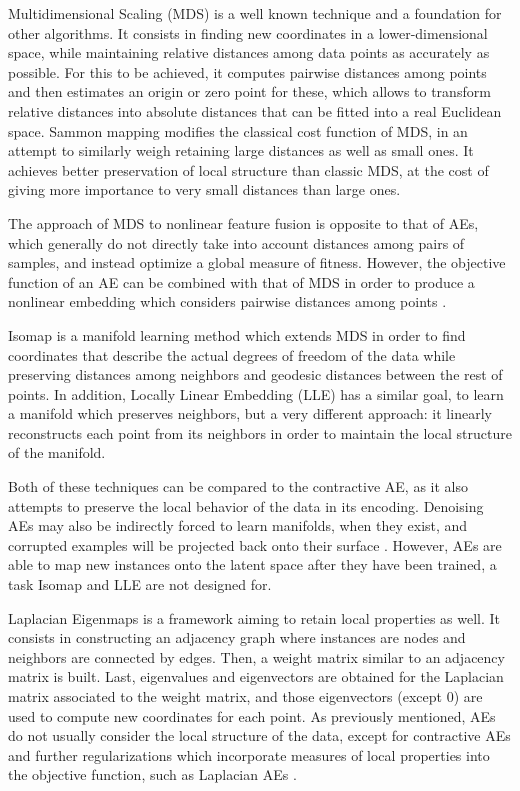 Multidimensional Scaling (MDS)  is a well known technique and a foundation for other algorithms. It consists in finding new coordinates in a lower-dimensional space, while maintaining relative distances among data points as accurately as possible. For this to be achieved, it computes pairwise distances among points and then estimates an origin or zero point for these, which allows to transform relative distances into absolute distances that can be fitted into a real Euclidean space. Sammon mapping  modifies the classical cost function of MDS, in an attempt to similarly weigh retaining large distances as well as small ones. It achieves better preservation of local structure than classic MDS, at the cost of giving more importance to very small distances than large ones.  

The approach of MDS to nonlinear feature fusion is opposite to that of AEs, which generally do not directly take into account distances among pairs of samples, and instead optimize a global measure of fitness. However, the objective function of an AE can be combined with that of MDS in order to produce a nonlinear embedding which considers pairwise distances among points .

Isomap  is a manifold learning method which extends MDS in order to find coordinates that describe the actual degrees of freedom of the data while preserving distances among neighbors and geodesic distances between the rest of points. In addition, Locally Linear Embedding (LLE)  has a similar goal, to learn a manifold which preserves neighbors, but a very different approach: it linearly reconstructs each point from its neighbors in order to maintain the local structure of the manifold.

Both of these techniques can be compared to the contractive AE, as it also attempts to preserve the local behavior of the data in its encoding. Denoising AEs may also be indirectly forced to learn manifolds, when they exist, and corrupted examples will be projected back onto their surface . However, AEs are able to map new instances onto the latent space after they have been trained, a task Isomap and LLE are not designed for.

Laplacian Eigenmaps  is a framework aiming to retain local properties as well. It consists in constructing an adjacency graph where instances are nodes and neighbors are connected by edges. Then, a weight matrix similar to an adjacency matrix is built. Last, eigenvalues and eigenvectors are obtained for the Laplacian matrix associated to the weight matrix, and those eigenvectors (except 0) are used to compute new coordinates for each point. As previously mentioned, AEs do not usually consider the local structure of the data, except for contractive AEs and further regularizations which incorporate measures of local properties into the objective function, such as Laplacian AEs .

